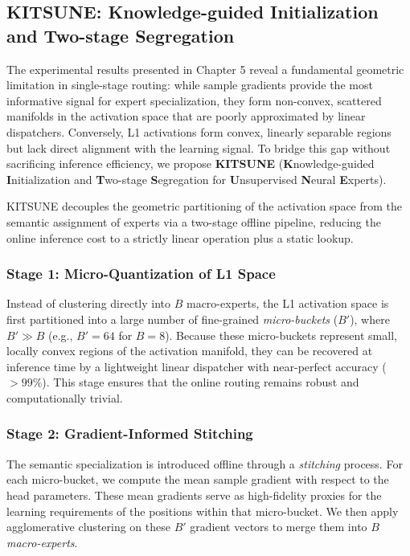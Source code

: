 \subsection{KITSUNE: Knowledge-guided Initialization and Two-stage Segregation}
\label{sec:kitsune}

The experimental results presented in Chapter 5 reveal a fundamental geometric limitation in single-stage routing: while sample gradients provide the most informative signal for expert specialization, they form non-convex, scattered manifolds in the activation space that are poorly approximated by linear dispatchers. Conversely, L1 activations form convex, linearly separable regions but lack direct alignment with the learning signal. To bridge this gap without sacrificing inference efficiency, we propose \textbf{KITSUNE} (\textbf{K}nowledge-guided \textbf{I}nitialization and \textbf{T}wo-stage \textbf{S}egregation for \textbf{U}nsupervised \textbf{N}eural \textbf{E}xperts).

KITSUNE decouples the geometric partitioning of the activation space from the semantic assignment of experts via a two-stage offline pipeline, reducing the online inference cost to a strictly linear operation plus a static lookup.

\subsubsection*{Stage 1: Micro-Quantization of L1 Space}
Instead of clustering directly into $B$ macro-experts, the L1 activation space is first partitioned into a large number of fine-grained \emph{micro-buckets} ($B'$), where $B' \gg B$ (e.g., $B'=64$ for $B=8$). Because these micro-buckets represent small, locally convex regions of the activation manifold, they can be recovered at inference time by a lightweight linear dispatcher with near-perfect accuracy ($>99\%$). This stage ensures that the online routing remains robust and computationally trivial.

\subsubsection*{Stage 2: Gradient-Informed Stitching}
The semantic specialization is introduced offline through a \emph{stitching} process. For each micro-bucket, we compute the mean sample gradient with respect to the head parameters. These mean gradients serve as high-fidelity proxies for the learning requirements of the positions within that micro-bucket. We then apply agglomerative clustering on these $B'$ gradient vectors to merge them into $B$ \emph{macro-experts}. 

